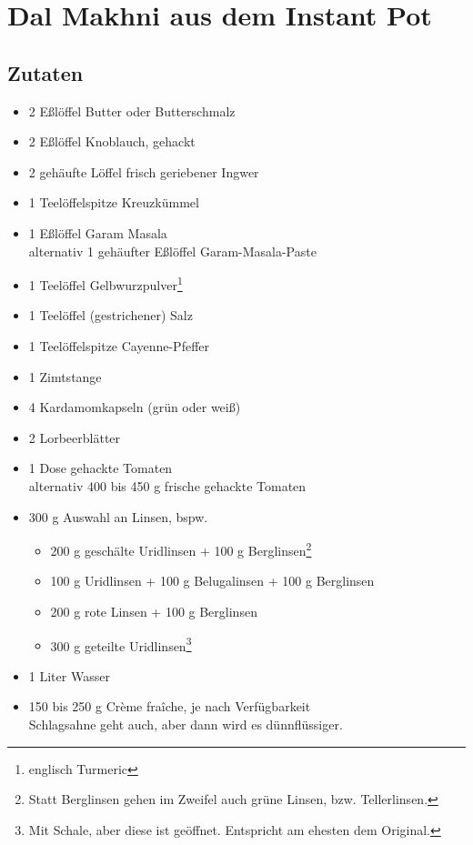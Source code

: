 \documentclass[version=last,fontsize=11pt,paper=A4]{scrartcl}
\begin{document}
\thispagestyle{empty}


\section*{Dal Makhni aus dem Instant Pot}

\subsection*{Zutaten}

\begin{itemize}
    \item 2 Eßlöffel Butter oder Butterschmalz
    \item 2 Eßlöffel Knoblauch, gehackt
    \item 2 gehäufte Löffel frisch geriebener Ingwer
    \item 1 Teelöffelspitze Kreuzkümmel
    \item 1 Eßlöffel Garam Masala\\
          alternativ 1 gehäufter Eßlöffel Garam-Masala-Paste
    \item 1 Teelöffel Gelbwurzpulver\footnote{englisch Turmeric}
    \item 1 Teelöffel (gestrichener) Salz
    \item 1 Teelöffelspitze Cayenne-Pfeffer
    \item 1 Zimtstange
    \item 4 Kardamomkapseln (grün oder weiß)
    \item 2 Lorbeerblätter
    \item 1 Dose gehackte Tomaten\\
          alternativ 400 bis 450 g frische gehackte Tomaten
    \item 300 g Auswahl an Linsen, bspw.
    \begin{itemize}
        \item 200 g geschälte Uridlinsen + 100 g Berglinsen\footnote{Statt Berglinsen gehen im Zweifel auch grüne Linsen, bzw. Tellerlinsen.}
        \item 100 g Uridlinsen + 100 g Belugalinsen + 100 g Berglinsen
        \item 200 g rote Linsen + 100 g Berglinsen
        \item 300 g geteilte Uridlinsen\footnote{Mit Schale, aber diese ist geöffnet. Entspricht am ehesten dem Original.}
    \end{itemize}
    \item 1 Liter Wasser
    \item 150 bis 250 g Crème fraîche, je nach Verfügbarkeit\\
          Schlagsahne geht auch, aber dann wird es dünnflüssiger.
\end{itemize}
\end{document}
